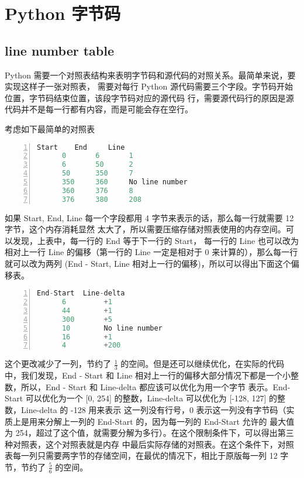 
\chapter{Python 字节码}

\section{line number table}

Python 需要一个对照表结构来表明字节码和源代码的对照关系。最简单来说，要实现这样子一张对照表，
需要对每行 Python 源代码需要三个字段。字节码开始位置，字节码结束位置，该段字节码对应的源代码
行，需要源代码行的原因是源代码并不是每一行都有内容，而是可能会存在空行。

考虑如下最简单的对照表

\begin{lstlisting}[language=C, numbers=left, numbersep=1em, numberstyle=\footnotesize , breaklines=true]
     Start    End     Line
      0       6       1
      6       50      2
      50      350     7
      350     360     No line number
      360     376     8
      376     380     208
\end{lstlisting}

如果 Start, End, Line 每一个字段都用 4 字节来表示的话，那么每一行就需要 12 字节，这个内存消耗显然
太大了，所以需要压缩存储对照表使用的内存空间。可以发现，上表中，每一行的 End 等于下一行的 Start，
每一行的 Line 也可以改为相对上一行 Line 的偏移（第一行的 Line 一定是相对于 0 来计算的），那么每一行
就可以改为两列 (End - Start, Line 相对上一行的偏移)，所以可以得出下面这个偏移表。

\begin{lstlisting}[language=C, numbers=left, numbersep=1em, numberstyle=\footnotesize , breaklines=true]
   End-Start  Line-delta
      6         +1
      44        +1
      300       +5
      10        No line number
      16        +1
      4         +200
\end{lstlisting}

这个更改减少了一列，节约了 $\frac{1}{3}$ 的空间。但是还可以继续优化，在实际的代码中，我们发现，End - Start
 和 Line 相对上一行的偏移大部分情况下都是一个小整数，所以，End - Start 和 Line-delta 都应该可以优化为用一个字节
 表示。End-Start 可以优化为一个 [0, 254] 的整数，Line-delta 可以优化为 [-128, 127] 的整数，Line-delta 的 -128 用来表示
 这一列没有行号，0 表示这一列没有字节码（实质上是用来分解上一列的 End-Start 的，因为每一列的 End-Start 允许的
 最大值为 254，超过了这个值，就需要分解为多行）。在这个限制条件下，可以得出第三种对照表，这个对照表就是内存
 中最后实际存储的对照表。在这个条件下，对照表每一列只需要两字节的存储空间，在最优的情况下，相比于原版每一列
 12 字节，节约了 $\frac{5}{6}$ 的空间。
 
